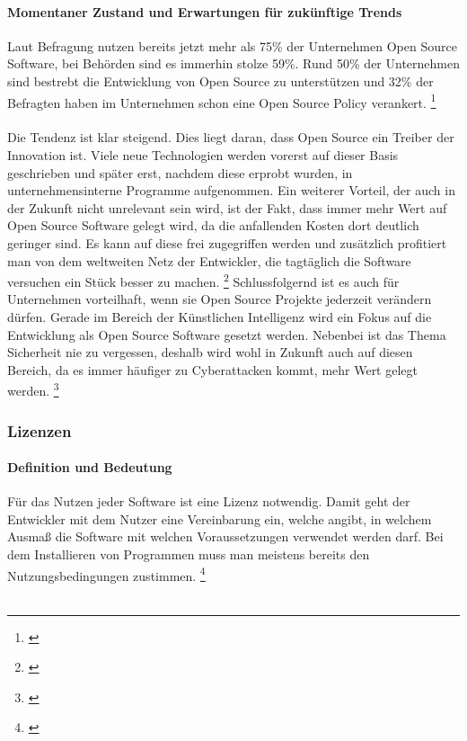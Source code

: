 \documentclass[titlepage,12pt,twoside]{article}
\begin{document}
\paragraph{Momentaner Zustand und Erwartungen für zukünftige Trends}
\hfill \break
\hfill \break
Laut Befragung nutzen bereits jetzt mehr als 75\% der Unternehmen Open Source Software, bei Behörden sind es 
immerhin stolze 59\%. Rund 50\% der Unternehmen sind bestrebt die Entwicklung von Open Source zu unterstützen 
und 32\% der Befragten haben im Unternehmen schon eine Open Source Policy verankert. \footnote{\cite{PWC}} \\
\\
Die Tendenz ist klar steigend. Dies liegt daran, dass Open Source ein Treiber der Innovation ist. Viele neue 
Technologien werden vorerst auf dieser Basis geschrieben und später erst, nachdem diese erprobt wurden, in 
unternehmensinterne Programme aufgenommen. Ein weiterer Vorteil, der auch in der Zukunft nicht unrelevant 
sein wird, ist der Fakt, dass immer mehr Wert auf Open Source Software gelegt wird, da die anfallenden Kosten 
dort deutlich geringer sind. Es kann auf diese frei zugegriffen werden und zusätzlich profitiert man von dem 
weltweiten Netz der Entwickler, die tagtäglich die Software versuchen ein Stück besser zu machen. \footnote{\cite{PWC2}}
Schlussfolgernd ist es auch für Unternehmen vorteilhaft, wenn sie Open Source Projekte jederzeit verändern 
dürfen. Gerade im Bereich der Künstlichen Intelligenz wird ein Fokus auf die Entwicklung als Open Source 
Software gesetzt werden. Nebenbei ist das Thema Sicherheit nie zu vergessen, deshalb wird wohl in Zukunft 
auch auf diesen Bereich, da es immer häufiger zu Cyberattacken kommt, mehr Wert gelegt werden. \footnote{\cite{bitkom}} \\
\subsubsection{Lizenzen}
\paragraph{Definition und Bedeutung}
\hfill \break
\hfill \break
Für das Nutzen jeder Software ist eine Lizenz notwendig. Damit geht der Entwickler mit dem Nutzer
eine Vereinbarung ein, welche angibt, in welchem Ausmaß die Software mit welchen Voraussetzungen verwendet 
werden darf. Bei dem Installieren von Programmen muss man meistens bereits den Nutzungsbedingungen zustimmen. \footnote{\cite{Simpleclub23}} \\
\\
\end{document}

